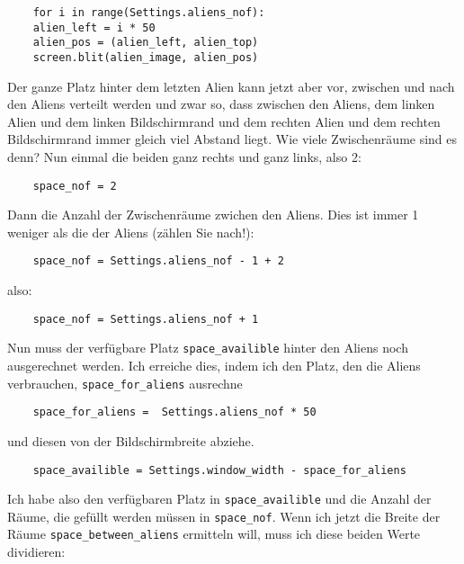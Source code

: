 \lstset{firstnumber=45}
\begin{lstlisting}
	for i in range(Settings.aliens_nof):
	alien_left = i * 50
	alien_pos = (alien_left, alien_top)
	screen.blit(alien_image, alien_pos)
\end{lstlisting}




Der ganze Platz hinter dem letzten Alien kann jetzt aber vor, zwischen und nach den Aliens verteilt werden und zwar so, dass zwischen den Aliens, dem linken Alien und dem linken Bildschirmrand und dem rechten Alien und dem rechten Bildschirmrand immer gleich viel Abstand liegt. Wie viele Zwischenräume sind es denn? Nun einmal die beiden ganz rechts und ganz links, also 2:

\lstset{firstnumber=31}
\begin{lstlisting}
	space_nof = 2  
\end{lstlisting}

Dann die Anzahl der Zwischenräume zwichen den Aliens. Dies ist immer 1 weniger als die der Aliens (zählen Sie nach!):

\lstset{firstnumber=31}
\begin{lstlisting}
	space_nof = Settings.aliens_nof - 1 + 2
\end{lstlisting}

also:

\lstset{firstnumber=31}
\begin{lstlisting}
	space_nof = Settings.aliens_nof + 1     
\end{lstlisting}

Nun muss der verfügbare Platz \texttt{space\_availible} hinter den Aliens noch ausgerechnet werden. Ich erreiche dies, indem ich den Platz, den die Aliens verbrauchen, \texttt{space\_\-for\_\-a\-liens} ausrechne

\lstset{firstnumber=29}
\begin{lstlisting}
	space_for_aliens =  Settings.aliens_nof * 50     
\end{lstlisting}

und diesen von der Bildschirmbreite abziehe.
\lstset{firstnumber=30}
\begin{lstlisting}
	space_availible = Settings.window_width - space_for_aliens
\end{lstlisting}

Ich habe also den verfügbaren Platz in \texttt{space\_availible} und die Anzahl der Räume, die gefüllt werden müssen in \texttt{space\_nof}. Wenn ich jetzt die Breite der Räume \texttt{space\_between\_\-aliens} ermitteln will, muss ich diese beiden Werte dividieren:

